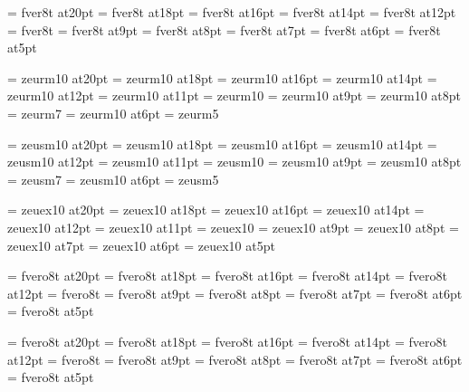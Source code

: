 
\font\twentyrm=     fver8t at20pt
\font\eighteenrm=   fver8t at18pt
\font\sixteenrm=    fver8t at16pt
\font\fourteenrm=   fver8t at14pt
\font\twelverm=     fver8t at12pt
\font\tenrm=        fver8t
\font\ninerm=       fver8t at9pt
\font\eightrm=      fver8t at8pt
\font\sevenrm=      fver8t at7pt
\font\sixrm=        fver8t at6pt
\font\fiverm=       fver8t at5pt

\font\twentyi=      zeurm10 at20pt
\font\eighteeni=    zeurm10 at18pt
\font\sixteeni=     zeurm10 at16pt
\font\fourteeni=    zeurm10 at14pt
\font\twelvei=      zeurm10 at12pt
\font\eleveni=      zeurm10 at11pt
\font\teni=         zeurm10
\font\ninei=        zeurm10 at9pt
\font\eighti=       zeurm10 at8pt
\font\seveni=       zeurm7
\font\sixi=         zeurm10 at6pt
\font\fivei=        zeurm5

\font\twentysy=     zeusm10 at20pt
\font\eighteensy=   zeusm10 at18pt
\font\sixteensy=    zeusm10 at16pt
\font\fourteensy=   zeusm10 at14pt
\font\twelvesy=     zeusm10 at12pt
\font\elevensy=     zeusm10 at11pt
\font\tensy=        zeusm10
\font\ninesy=       zeusm10 at9pt
\font\eightsy=      zeusm10 at8pt
\font\sevensy=      zeusm7
\font\sixsy=        zeusm10 at6pt
\font\fivesy=       zeusm5

\font\twentyex=     zeuex10 at20pt
\font\eighteenex=   zeuex10 at18pt
\font\sixteenex=    zeuex10 at16pt
\font\fourteenex=   zeuex10 at14pt
\font\twelveex=     zeuex10 at12pt
\font\elevenex=     zeuex10 at11pt
\font\tenex=        zeuex10 
\font\nineex=       zeuex10 at9pt
\font\eightex=      zeuex10 at8pt
\font\sevenex=      zeuex10 at7pt
\font\sixex=        zeuex10 at6pt
\font\fiveex=       zeuex10 at5pt

\font\twentyit=     fvero8t at20pt
\font\eighteenit=   fvero8t at18pt
\font\sixteenit=    fvero8t at16pt
\font\fourteenit=   fvero8t at14pt
\font\twelveit=     fvero8t at12pt
\font\tenit=        fvero8t
\font\nineit=       fvero8t at9pt
\font\eightit=      fvero8t at8pt
\font\sevenit=      fvero8t at7pt
\font\sixit=        fvero8t at6pt
\font\fiveit=       fvero8t at5pt

\font\twentysl=     fvero8t at20pt
\font\eighteensl=   fvero8t at18pt
\font\sixteensl=    fvero8t at16pt
\font\fourteensl=   fvero8t at14pt
\font\twelvesl=     fvero8t at12pt
\font\tensl=        fvero8t
\font\ninesl=       fvero8t at9pt
\font\eightsl=      fvero8t at8pt
\font\sevensl=      fvero8t at7pt
\font\sixsl=        fvero8t at6pt
\font\fivesl=       fvero8t at5pt

